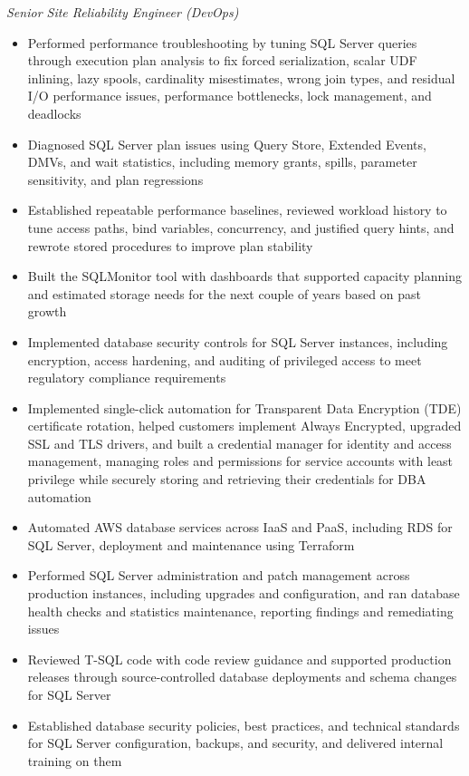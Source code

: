 \documentclass[10pt,a4paper]{article}
\begin{document}
\textit{Senior Site Reliability Engineer (DevOps)}\\[-5pt]
\begin{itemize}
  \item Performed performance troubleshooting by tuning SQL Server queries through execution plan analysis to fix forced serialization, scalar UDF inlining, lazy spools, cardinality misestimates, wrong join types, and residual I/O performance issues, performance bottlenecks, lock management, and deadlocks
  \item Diagnosed SQL Server plan issues using Query Store, Extended Events, DMVs, and wait statistics, including memory grants, spills, parameter sensitivity, and plan regressions
  \item Established repeatable performance baselines, reviewed workload history to tune access paths, bind variables, concurrency, and justified query hints, and rewrote stored procedures to improve plan stability
  \item Built the SQLMonitor tool with dashboards that supported capacity planning and estimated storage needs for the next couple of years based on past growth
  \item Implemented database security controls for SQL Server instances, including encryption, access hardening, and auditing of privileged access to meet regulatory compliance requirements
  \item Implemented single-click automation for Transparent Data Encryption (TDE) certificate rotation, helped customers implement Always Encrypted, upgraded SSL and TLS drivers, and built a credential manager for identity and access management, managing roles and permissions for service accounts with least privilege while securely storing and retrieving their credentials for DBA automation
  \item Automated AWS database services across IaaS and PaaS, including RDS for SQL Server, deployment and maintenance using Terraform
  \item Performed SQL Server administration and patch management across production instances, including upgrades and configuration, and ran database health checks and statistics maintenance, reporting findings and remediating issues
  \item Reviewed T-SQL code with code review guidance and supported production releases through source-controlled database deployments and schema changes for SQL Server
  \item Established database security policies, best practices, and technical standards for SQL Server configuration, backups, and security, and delivered internal training on them

\end{itemize}
\end{document}
